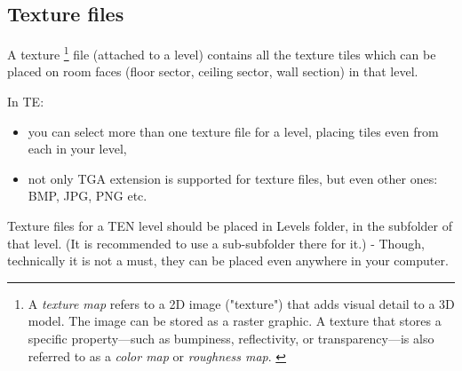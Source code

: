 \subsection{Texture files}
A texture \footnote{A \emph{texture map}  refers to a 2D image ("texture") that adds visual detail to a 3D model. The image can be stored as a raster graphic. A texture that stores a specific property—such as bumpiness, reflectivity, or transparency—is also referred to as a \emph{color map} or \emph{roughness map}. \cite{texture_mapping_wikipedia}} file (attached to a level) contains all the texture tiles which can be placed on room faces (floor sector, ceiling sector, wall section) in that level.
\par In TE:
\begin{itemize}
    \item you can select more than one texture file for a level, placing tiles even from each in your level,
    \item not only TGA extension is supported for texture files, but even other ones: BMP, JPG, PNG etc.
\end{itemize}
Texture files for a TEN level should be placed in Levels folder, in the subfolder of that level. (It is recommended to use a sub-subfolder there for it.) - Though, technically it is not a must, they can be placed even anywhere in your computer.
